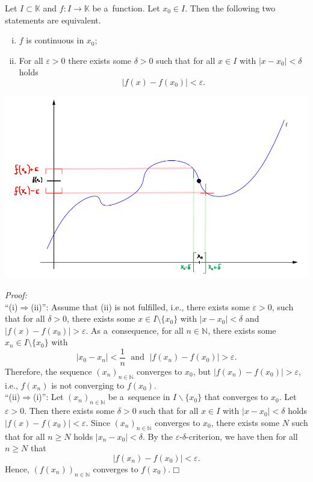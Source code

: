 

\begin{Theorem}
Let $I\subset \mathbb{K}$ and $f:I\to\mathbb{K}$ be a~function. Let $x_0\in I$. Then the following two statements are equivalent.
\begin{enumerate}[(i)]
 \item $f$ is continuous in $x_0$;
 \item For all $\varepsilon>0$ there exists some $\delta>0$ such that for all $x\in I$ with $|x-x_0|<\delta$ holds
\[|f(x)-f(x_0)|<\varepsilon.\]
\end{enumerate}
\end{Theorem}

\includegraphics{./eps.png}

{\em Proof:}\\
``(i)$\Rightarrow$(ii)'': Assume that (ii) is not fulfilled, i.e., there exists some $\varepsilon>0$, such that for all $\delta>0$, there exists some $x\in I\setminus\{x_{0}\}$ with $|x-x_0|<\delta$ and $|f(x)-f(x_0)|>\varepsilon$. As a~consequence, for all $n\in\mathbb{N}$, there exists some $x_n\in I\setminus\{x_{0}\}$ with
\[|x_0-x_n|<\frac1n\;\text{ and }\;|f(x_n)-f(x_0)|>\varepsilon.\]
Therefore, the sequence $(x_n)_{n\in\mathbb{N}}$ converges to $x_0$, but $|f(x_n)-f(x_0)|>\varepsilon$,
i.e., $f(x_n)$ is not converging to $f(x_0)$.\\
``(ii)$\Rightarrow$(i)'': Let  $(x_n)_{n\in\mathbb{N}}$ be a~sequence in $I\backslash\{x_0\}$ that converges to $x_0$. Let $\varepsilon>0$. Then there exists some $\delta>0$ such that for all $x\in I$ with $|x-x_0|<\delta$ holds $|f(x)-f(x_0)|<\varepsilon$. Since $(x_n)_{n\in\mathbb{N}}$ converges to $x_0$, there exists some $N$ such that for all $n\geq N$ holds $|x_n-x_0|<\delta$. By the $\varepsilon$-$\delta$-criterion, we have then for all $n\geq N$ that
\[|f(x_n)-f(x_0)|<\varepsilon.\]
Hence, $(f(x_n))_{n\in\mathbb{N}}$ converges to $f(x_0)$.\hfill$\Box$

